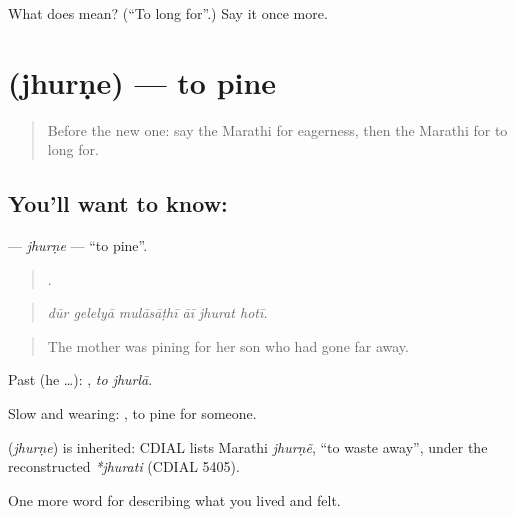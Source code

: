 \begin{tcolorbox}[breakable,colback=teal!4,colframe=teal!35!black,title={Before you move on}]
What does  mean? (\textquotedblleft{}To long for\textquotedblright{}.) Say it once more.
\end{tcolorbox}
\section[\texorpdfstring{\mr{झुरणे} (jhurṇe)}{झुरणे (jhurṇe)}]{ (jhurṇe) — to pine}

\label{lesson:MR-C459-jhurne}



\begin{quote}
Before the new one: say the Marathi for eagerness, then the Marathi for to long for.
\end{quote}

\subsection*{You'll want to know: }
\textbf{} — \emph{jhurṇe} — \textquotedblleft{}to pine\textquotedblright{}.

\begin{quote}
     .
\end{quote}

\begin{quote}
\emph{dūr gelelyā mulāsāṭhī āī jhurat hotī.}
\end{quote}

\begin{quote}
The mother was pining for her son who had gone far away.
\end{quote}

Past (he …):  , \emph{to jhurlā}.

Slow and wearing:  , to pine for someone.

\begin{cousinweb}
\textbf{} (\emph{jhurṇe}) is inherited: CDIAL lists Marathi \emph{jhurṇẽ}, \textquotedblleft{}to waste away\textquotedblright{}, under the reconstructed \emph{*jhurati} (CDIAL 5405).
\end{cousinweb}

\begin{grammarlens}[title={What you've built}]
One more word for describing what you lived and felt.
\end{grammarlens}

